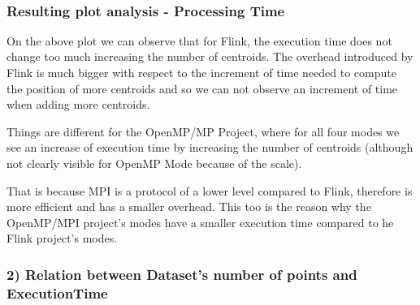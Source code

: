 \documentclass[11pt]{article}
\begin{document}
    \begin{center}
    \end{center}
    { \hspace*{\fill} \\}
    
    \hypertarget{resulting-plot-analysis---processing-time}{%
\subsubsection{Resulting plot analysis - Processing
Time}\label{resulting-plot-analysis---processing-time}}

On the above plot we can observe that for Flink, the execution time does
not change too much increasing the number of centroids. The overhead
introduced by Flink is much bigger with respect to the increment of time
needed to compute the position of more centroids and so we can not
observe an increment of time when adding more centroids.

Things are different for the OpenMP/MP Project, where for all four modes
we see an increase of execution time by increasing the number of
centroids (although not clearly visible for OpenMP Mode because of the
scale).

That is because MPI is a protocol of a lower level compared to Flink,
therefore is more efficient and has a smaller overhead. This too is the
reason why the OpenMP/MPI project's modes have a smaller execution time
compared to he Flink project's modes.

    \hypertarget{relation-between-datasets-number-of-points-and-executiontime}{%
\subsubsection{2) Relation between Dataset's number of points and
ExecutionTime}\label{relation-between-datasets-number-of-points-and-executiontime}}
\end{document}
